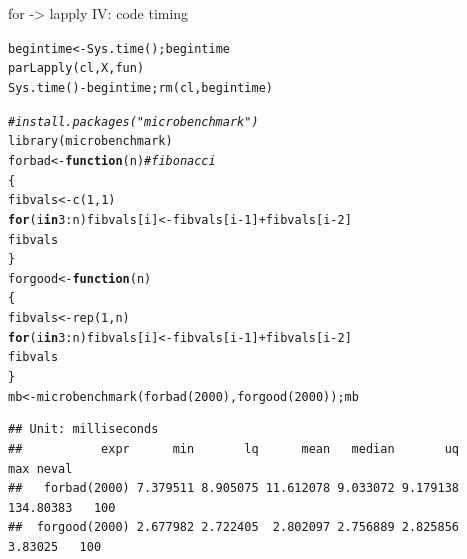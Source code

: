 \documentclass[xcolor=table,           xcolor=dvipsnames]{beamer}\usepackage[]{graphicx}\usepackage[]{color}
\makeatletter
\newcommand{\hlnum}[1]{\textcolor[rgb]{0,0,0}{#1}}
\newcommand{\hlcom}[1]{\textcolor[rgb]{0,0.392,0}{\textit{#1}}}
\newcommand{\hlopt}[1]{\textcolor[rgb]{0,0,0}{#1}}
\newcommand{\hlstd}[1]{\textcolor[rgb]{0,0,0}{#1}}
\newcommand{\hlkwa}[1]{\textcolor[rgb]{1,0,0}{\textbf{#1}}}
\newcommand{\hlkwb}[1]{\textcolor[rgb]{0,0,0}{#1}}
\newcommand{\hlkwc}[1]{\textcolor[rgb]{1,0,1}{#1}}
\newcommand{\hlkwd}[1]{\textcolor[rgb]{0,0,1}{#1}}
\newenvironment{kframe}{%
 \def\at@end@of@kframe{}%
 \ifinner\ifhmode%
  \def\at@end@of@kframe{\end{minipage}}%
  \begin{minipage}{\columnwidth}%
 \fi\fi%
 \def\FrameCommand##1{\hskip\@totalleftmargin \hskip-\fboxsep
 \colorbox{shadecolor}{##1}\hskip-\fboxsep
     \hskip-\linewidth \hskip-\@totalleftmargin \hskip\columnwidth}%
 \MakeFramed {\advance\hsize-\width
   \@totalleftmargin\z@ \linewidth\hsize
   \@setminipage}}%
 {\par\unskip\endMakeFramed%
 \at@end@of@kframe}
\newenvironment{knitrout}{}{} %
\makeatother
\begin{document}

\begin{frame}[fragile]{for -> lapply IV: code timing}
\vspace{-0.8em}
\scriptsize
\begin{knitrout}
\color{fgcolor}\begin{kframe}
\begin{alltt}
\hlstd{begintime} \hlkwb{<-} \hlkwd{Sys.time}\hlstd{(); begintime}
\hlkwd{parLapply}\hlstd{(cl, X, fun)}
\hlkwd{Sys.time}\hlstd{()} \hlopt{-} \hlstd{begintime ;} \hlkwd{rm}\hlstd{(cl, begintime)}
\end{alltt}
\end{kframe}
\end{knitrout}
\pause \vspace{-1.2em}
\begin{knitrout}\scriptsize
{}\color{fgcolor}\begin{kframe}
\begin{alltt}
\hlcom{#install.packages("microbenchmark")}
\hlkwd{library}\hlstd{(microbenchmark)}
\hlstd{forbad} \hlkwb{<-} \hlkwa{function}\hlstd{(}\hlkwc{n}\hlstd{)}  \hlcom{# fibonacci}
  \hlstd{\{}
  \hlstd{fibvals} \hlkwb{<-} \hlkwd{c}\hlstd{(}\hlnum{1}\hlstd{,}\hlnum{1}\hlstd{)}
  \hlkwa{for} \hlstd{(i} \hlkwa{in} \hlnum{3}\hlopt{:}\hlstd{n) fibvals[i]} \hlkwb{<-} \hlstd{fibvals[i}\hlopt{-}\hlnum{1}\hlstd{]}\hlopt{+}\hlstd{fibvals[i}\hlopt{-}\hlnum{2}\hlstd{]}
  \hlstd{fibvals}
  \hlstd{\}}
\hlstd{forgood} \hlkwb{<-} \hlkwa{function}\hlstd{(}\hlkwc{n}\hlstd{)}
  \hlstd{\{}
  \hlstd{fibvals} \hlkwb{<-} \hlkwd{rep}\hlstd{(}\hlnum{1}\hlstd{,n)}
  \hlkwa{for} \hlstd{(i} \hlkwa{in} \hlnum{3}\hlopt{:}\hlstd{n) fibvals[i]} \hlkwb{<-} \hlstd{fibvals[i}\hlopt{-}\hlnum{1}\hlstd{]}\hlopt{+}\hlstd{fibvals[i}\hlopt{-}\hlnum{2}\hlstd{]}
  \hlstd{fibvals}
  \hlstd{\}}
\hlstd{mb} \hlkwb{<-} \hlkwd{microbenchmark}\hlstd{(}\hlkwd{forbad}\hlstd{(}\hlnum{2000}\hlstd{),} \hlkwd{forgood}\hlstd{(}\hlnum{2000}\hlstd{))  ;  mb}
\end{alltt}
\begin{verbatim}
## Unit: milliseconds
##           expr      min       lq      mean   median       uq       max neval
##   forbad(2000) 7.379511 8.905075 11.612078 9.033072 9.179138 134.80383   100
##  forgood(2000) 2.677982 2.722405  2.802097 2.756889 2.825856   3.83025   100
\end{verbatim}
\end{kframe}
\end{knitrout}
\end{frame}
\end{document}

